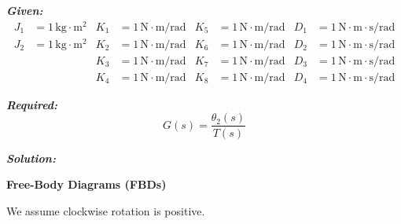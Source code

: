 \documentclass[11pt]{article}
\begin{document}
\vspace{12pt}

\noindent\textbf{\textit{Given:}}
\[
\begin{aligned}
J_1 &= 1\, \text{kg}\cdot\text{m}^2 & K_1 &= 1\, \text{N}\cdot\text{m/rad} & K_5 &= 1\, \text{N}\cdot\text{m/rad} & D_1 &= 1\, \text{N}\cdot\text{m}\cdot\text{s/rad} \\
J_2 &= 1\, \text{kg}\cdot\text{m}^2 & K_2 &= 1\, \text{N}\cdot\text{m/rad} & K_6 &= 1\, \text{N}\cdot\text{m/rad} & D_2 &= 1\, \text{N}\cdot\text{m}\cdot\text{s/rad} \\
& & K_3 &= 1\, \text{N}\cdot\text{m/rad} & K_7 &= 1\, \text{N}\cdot\text{m/rad} & D_3 &= 1\, \text{N}\cdot\text{m}\cdot\text{s/rad} \\
& & K_4 &= 1\, \text{N}\cdot\text{m/rad} & K_8 &= 1\, \text{N}\cdot\text{m/rad} & D_4 &= 1\, \text{N}\cdot\text{m}\cdot\text{s/rad}
\end{aligned}
\]

\vspace{12pt}

\noindent \textbf{\textit{Required:}}
\[
G(s) = \frac{\theta_2(s)}{T(s)}
\]

\vspace{12pt}

\noindent \textbf{\textit{Solution:}}

\vspace{12pt}

\noindent\textbf{Free-Body Diagrams (FBDs)}

\vspace{12pt}

We assume clockwise rotation is positive.
\end{document}
